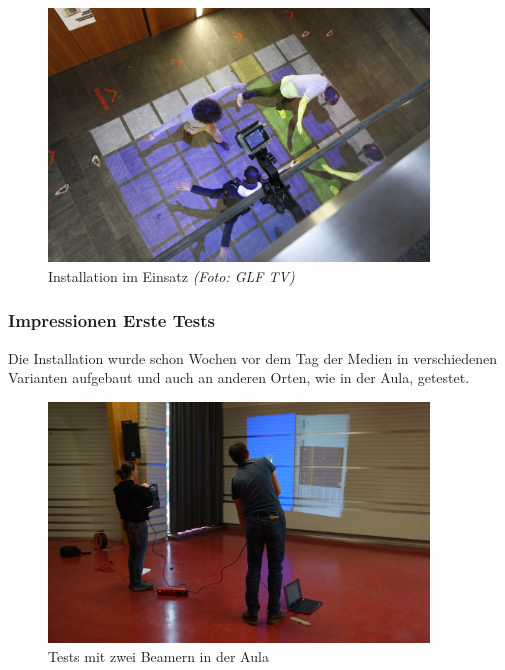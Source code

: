 \begin{figure}[htbp]
	\centering
		\includegraphics[width=0.9\textwidth]{images/TdM5.jpg}
	\caption{Installation im Einsatz \textit{(Foto: GLF TV)}}
	\label{fig:TdM5}
\end{figure}
\clearpage

\subsubsection{Impressionen Erste Tests}
Die Installation wurde schon Wochen vor dem Tag der Medien in verschiedenen Varianten aufgebaut und auch an anderen Orten, wie in der Aula, getestet.

\begin{figure}[htbp]
	\centering
		\includegraphics[width=0.9\textwidth]{images/Test1.png}
	\caption{Tests mit zwei Beamern in der Aula}
	\label{fig:Test1}
\end{figure}

